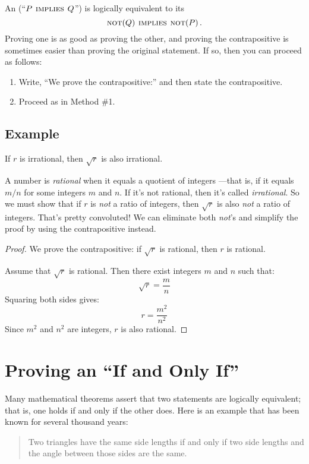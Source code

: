 An  (``$P \mathbin{\mathrm{\textsc{\,implies\,}}} Q$'') is logically equivalent to its
\[
\mathop{\mathrm{\textsc{not}}}(Q) \mathbin{\mathrm{\textsc{\,implies\,}}} \mathop{\mathrm{\textsc{not}}}(P)\,.
\]
Proving one is as good as proving the other, and proving the
contrapositive is sometimes easier than proving the original statement.
If so, then you can proceed as follows:
%
\begin{enumerate}
\item Write, ``We prove the contrapositive:'' and then state the
contrapositive.
\item Proceed as in Method \#1.
\end{enumerate}

\subsection*{Example}

\begin{theorem}
If $r$ is irrational, then $\sqrt{r}$ is also irrational.
\end{theorem}

A number is \emph{rational} when it equals a quotient of integers
---that is, if it equals $m/n$ for some integers $m$ and $n$.  If it's
not rational, then it's called \emph{irrational}.  So we must show
that if $r$ is \textit{not} a ratio of integers, then $\sqrt{r}$ is
also \textit{not} a ratio of integers.  That's pretty convoluted!  We
can eliminate both \emph{not}'s and simplify the proof by using the
contrapositive instead.

\begin{proof}
We prove the contrapositive: if $\sqrt{r}$ is rational, then $r$ is
rational.

Assume that $\sqrt{r}$ is rational.  Then there exist integers $m$ and $n$
such that:
%
\[
\sqrt{r} = \frac{m}{n}
\]
%
Squaring both sides gives:
%
\[
r  = \frac{m^2}{n^2}
\]
%
Since $m^2$ and $n^2$ are integers, $r$ is also rational.
\end{proof}

\begin{problems}
\homeworkproblems
{}
\end{problems}

\section{Proving an ``If and Only If''}
\label{sec:prove_iff}

Many mathematical theorems assert that two statements are logically
equivalent; that is, one holds if and only if the other does.  Here is an
example that has been known for several thousand years:
\begin{quote}
Two triangles have the same side lengths if and only if two
side lengths and the angle between those sides are the same.
\end{quote}


